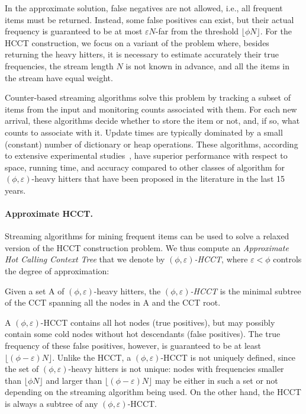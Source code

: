 \noindent In the approximate solution, false negatives are not allowed, i.e., all frequent items must be returned. Instead, some false positives can exist, but their actual frequency is guaranteed to be at most $\varepsilon N$-far from the threshold $\lfloor\phi N\rfloor$. For the HCCT construction, we focus on a variant of the problem where, besides returning the heavy hitters, it is necessary to estimate accurately their true frequencies, the stream length $N$ is not known in advance, and all the items in the stream have equal weight.

Counter-based streaming algorithms solve this problem by tracking a subset of items from the input and monitoring counts associated with them. For each new arrival, these algorithms decide whether to store the item or not, and, if so, what counts to associate with it. Update times are typically dominated by a small (constant) number of dictionary or heap operations. These algorithms, according to extensive experimental studies~\cite{Cormode08}, have superior performance with respect to space, running time, and accuracy compared to other classes of algorithm for $(\phi,\varepsilon)$-heavy hitters that have been proposed in the literature in the last 15 years.

\paragraph*{Approximate HCCT.} Streaming algorithms for mining frequent items can be used to solve a relaxed version of the HCCT construction problem. We thus compute an {\em Approximate Hot Calling Context Tree} that we denote by {\em $(\phi,\varepsilon)$-HCCT}, where $\varepsilon<\phi$ controls the degree of approximation:

\begin{definition}
Given a set A of $(\phi,\varepsilon)$-heavy hitters, the {\em $(\phi,\varepsilon)$-HCCT} is the minimal subtree of the CCT spanning all the nodes in A and the CCT root.
\end{definition}

\noindent A $(\phi,\varepsilon)$-HCCT contains all hot nodes (true positives), but may possibly contain some cold nodes without hot descendants (false positives). The true frequency of these false positives, however, is guaranteed to be at least $\lfloor(\phi-\varepsilon) N\rfloor$. Unlike the HCCT, a $(\phi,\varepsilon)$-HCCT is not uniquely defined, since the set of $(\phi,\varepsilon)$-heavy hitters is not unique: nodes with frequencies smaller than $\lfloor\phi N\rfloor$ and larger than $\lfloor(\phi-\varepsilon) N\rfloor$ may be either in such a set or not depending on the streaming algorithm being used. On the other hand, the HCCT is always a subtree of any $(\phi,\varepsilon)$-HCCT.

